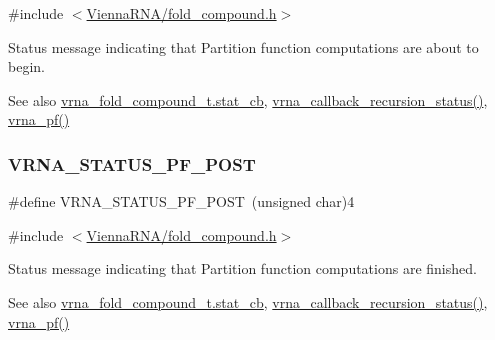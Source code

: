 {\ttfamily \#include $<$\hyperlink{fold__compound_8h}{Vienna\+R\+N\+A/fold\+\_\+compound.\+h}$>$}



Status message indicating that Partition function computations are about to begin. 

\begin{DoxySeeAlso}{See also}
\hyperlink{group__fold__compound_a87a83f6795b569000efcbe65acc3dd81}{vrna\+\_\+fold\+\_\+compound\+\_\+t.\+stat\+\_\+cb}, \hyperlink{group__fold__compound_gac86036fa8cad1108832335063243cdc8}{vrna\+\_\+callback\+\_\+recursion\+\_\+status()}, \hyperlink{group__part__func__global_ga29e256d688ad221b78d37f427e0e99bc}{vrna\+\_\+pf()} 
\end{DoxySeeAlso}
\mbox{\label{group__fold__compound_ga1c6fa243533fd026e50f7d595eaaa565}} 
\subsubsection{\texorpdfstring{V\+R\+N\+A\+\_\+\+S\+T\+A\+T\+U\+S\+\_\+\+P\+F\+\_\+\+P\+O\+ST}{VRNA\_STATUS\_PF\_POST}}
{\footnotesize\ttfamily \#define V\+R\+N\+A\+\_\+\+S\+T\+A\+T\+U\+S\+\_\+\+P\+F\+\_\+\+P\+O\+ST~(unsigned char)4}



{\ttfamily \#include $<$\hyperlink{fold__compound_8h}{Vienna\+R\+N\+A/fold\+\_\+compound.\+h}$>$}



Status message indicating that Partition function computations are finished. 

\begin{DoxySeeAlso}{See also}
\hyperlink{group__fold__compound_a87a83f6795b569000efcbe65acc3dd81}{vrna\+\_\+fold\+\_\+compound\+\_\+t.\+stat\+\_\+cb}, \hyperlink{group__fold__compound_gac86036fa8cad1108832335063243cdc8}{vrna\+\_\+callback\+\_\+recursion\+\_\+status()}, \hyperlink{group__part__func__global_ga29e256d688ad221b78d37f427e0e99bc}{vrna\+\_\+pf()} 
\end{DoxySeeAlso}
\mbox{\label{group__fold__compound_gae63be9127fe7dcc1f9bb14f5bb1064ee}} 
